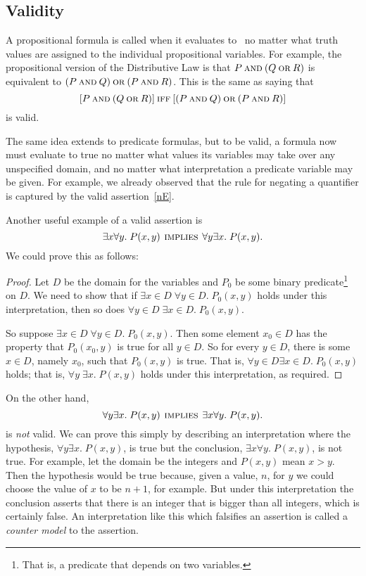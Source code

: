\iffalse Logicians have worked very hard to define strict rules for the
use of logic notation so that ideas can be expressed with absolute rigor.
It's all quite charming and clever.  However, the sad irony is that
applied mathematicans usually use their beloved notation as a crude
shorthand, breaking the rules and abusing the notation willy-nilly ---sort
of like pounding nails with fine china.  \fi

\subsection{Validity}

A propositional formula is called  when it evaluates to \true\
no matter what truth values are assigned to the individual propositional
variables.  For example, the propositional version of the Distributive Law
is that $P \mathbin{\mathrm{\textsc{and}}} (Q \mathbin{\mathrm{\textsc{or}}} R)$ is equivalent to $(P \mathbin{\mathrm{\textsc{and}}} Q) \mathbin{\mathrm{\textsc{or}}} (P \mathbin{\mathrm{\textsc{and}}}
R)$.  This is the same as saying that
\[
[P \mathbin{\mathrm{\textsc{and}}} (Q \mathbin{\mathrm{\textsc{or}}} R)] \mathbin{\mathrm{\textsc{iff}}} [(P \mathbin{\mathrm{\textsc{and}}} Q) \mathbin{\mathrm{\textsc{or}}} (P \mathbin{\mathrm{\textsc{and}}} R)]
\]
is valid.

The same idea extends to predicate formulas, but to be valid, a
formula now must evaluate to true no matter what values its variables
may take over any unspecified domain, and no matter what
interpretation a predicate variable may be given.  For example, we
already observed that the rule for negating a quantifier is captured
by the valid assertion~\eqref{nE}.

Another useful example of a valid assertion is
\[
\exists x \forall y.\; P(x,y) \mathbin{\mathrm{\textsc{\,implies\,}}} \forall y \exists x.\; P(x,y).
\]
We could prove this as follows:
\begin{proof}
Let $D$ be the domain for the variables and $P_0$ be some
binary predicate\footnote{That is, a predicate that depends on two variables.}
on $D$.  We need to show that if $\exists x \in D\; \forall y \in D.\;
P_0(x,y)$ holds under this interpretation, then so does $\forall y \in D\;
\exists x \in D.\; P_0(x,y)$.

So suppose $\exists x \in D\; \forall y \in D.\; P_0(x,y)$.  Then some
element $x_0 \in D$ has the property that $P_0(x_0, y)$ is true for all $y
\in D$.  So for every $y \in D$, there is some $x \in D$, namely $x_0$,
such that $P_0(x,y)$ is true.  That is, $\forall y \in D\exists x \in D.\;
P_0(x,y)$ holds; that is, $\forall y\; \exists x.\; P(x,y)$ holds under this
interpretation, as required.
\end{proof}

On the other hand,
\[
\forall y \exists x.\; P(x,y) \mathbin{\mathrm{\textsc{\,implies\,}}} \exists x \forall y.\; P(x,y).
\]
is \emph{not} valid.  We can prove this simply by describing an
interpretation where the hypothesis, $\forall y \exists x.\; P(x,y)$, is
true but the conclusion, $\exists x \forall y.\; P(x,y)$, is not true.
For example, let the domain be the integers and $P(x,y)$ mean $x > y$.
Then the hypothesis would be true because, given a value, $n$, for $y$ we
could choose the value of $x$ to be $n+1$, for example.  But under this
interpretation the conclusion asserts that there is an integer that is
bigger than all integers, which is certainly false.  An interpretation like
this which falsifies an assertion is called a \emph{counter model} to the
assertion.

